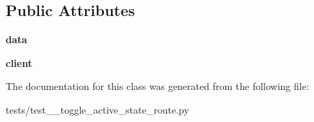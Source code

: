 \subsection*{Public Attributes}
\begin{DoxyCompactItemize}
\item 
\mbox{\label{classtests_1_1test__8__toggle__active__state__route_1_1_test_user_routes_afb4f6e3670d24b5ba5e3e468b612b94c}} 
{\bfseries data}
\item 
\mbox{\label{classtests_1_1test__8__toggle__active__state__route_1_1_test_user_routes_adef395112c8f0ae07aeaf02e591dae38}} 
{\bfseries client}
\end{DoxyCompactItemize}


The documentation for this class was generated from the following file\+:\begin{DoxyCompactItemize}
\item 
tests/test\+\_\+\_\+toggle\+\_\+active\+\_\+state\+\_\+route.\+py\end{DoxyCompactItemize}
